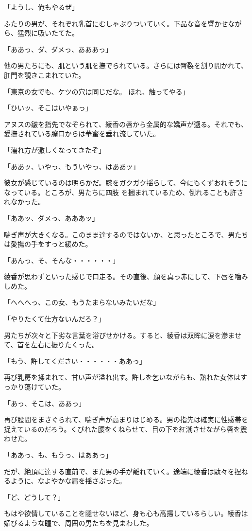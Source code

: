﻿\documentclass[book,tate]{jlreq}
\begin{document}
「ようし、俺もやるぜ」

ふたりの男が、それぞれ乳首にむしゃぶりついていく。下品な音を響かせながら、猛烈に吸いたてた。

「ああっ、ダ、ダメっ、あああっ」

他の男たちにも、肌という肌を撫でられている。さらには臀裂を割り開かれて、肛門を覗きこまれていた。

「東京の女でも、ケツの穴は同じだな。 ほれ、触ってやる」

「ひいッ、そこはいやぁっ」

アヌスの皺を指先でなぞられて、綾香の唇から金属的な嬌声が遡る。それでも、愛撫されている膣口からは華蜜を垂れ流していた。

「濡れ方が激しくなってきたぞ」

「ああッ、いやっ、もういやっ、はああッ」

彼女が感じているのは明らかだ。膝をガクガク揺らして、今にもくずおれそうになっている。ところが、男たちに四肢 を摑まれているため、倒れることも許されなかった。

「ああッ、ダメっ、あああッ」

喘ぎ声が大きくなる。このまま達するのではないか、と思ったところで、男たちは愛撫の手をすっと緩めた。

「あんっ、そ、そんな・・・・・・」

綾香が思わずといった感じで口走る。その直後、顔を真っ赤にして、下唇を噛みしめた。

「へへへっ、この女、もうたまらないみたいだな」

「やりたくて仕方ないんだろ？」

男たちが次々と下劣な言葉を浴びせかける。すると、綾香は双眸に涙を滲ませて、首を左右に振りたくった。

「もう、許してください・・・・・・ああっ」

再び乳房を揉まれて、甘い声が溢れ出す。許しを乞いながらも、熟れた女体はすっかり蕩けていた。

「あっ、そこは、ああっ」

再び股間をまさぐられて、喘ぎ声が高まりはじめる。男の指先は確実に性感帯を捉えているのだろう。くびれた腰をくねらせて、目の下を紅潮させながら唇を震わせた。

「ああっ、も、もうっ、はああっ」

だが、絶頂に達する直前で、また男の手が離れていく。途端に綾香は駄々を捏ねるように、なよやかな肩を揺さぶった。

「ど、どうして？」

もはや欲情していることを隠せないほど、身も心も高揚しているらしい。綾香は媚びるような瞳で、周囲の男たちを見まわした。
\end{document}

